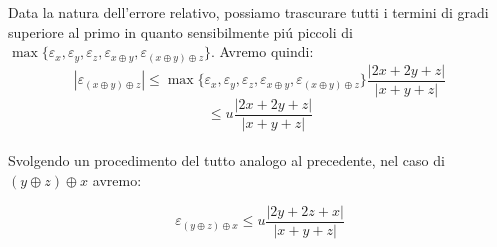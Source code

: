 \noindent Data la natura dell'errore relativo, possiamo trascurare tutti i termini di gradi superiore al primo in quanto sensibilmente pi\'u piccoli di \(\max \{\varepsilon_x, \varepsilon_y, \varepsilon_z, \varepsilon_{x \oplus y}, \varepsilon_{(x \oplus y) \oplus z}\} \). Avremo quindi:
\[
|\varepsilon_{(x \oplus y) \oplus z }| \leq \max \{\varepsilon_x, \varepsilon_y, \varepsilon_z, \varepsilon_{x \oplus y}, \varepsilon_{(x \oplus y) \oplus z}\} \frac{|2x + 2y + z|}{|x+y+z|}
\]
\[
\leq u \frac{|2x + 2y + z|}{|x+y+z|}
\]
\\
\noindent Svolgendo un procedimento del tutto analogo al precedente, nel caso di \((y \oplus z) \oplus x \) avremo:

\[
\varepsilon_{(y \oplus z) \oplus x } \leq u \frac{|2y + 2z + x|}{|x+y+z|}
\]

